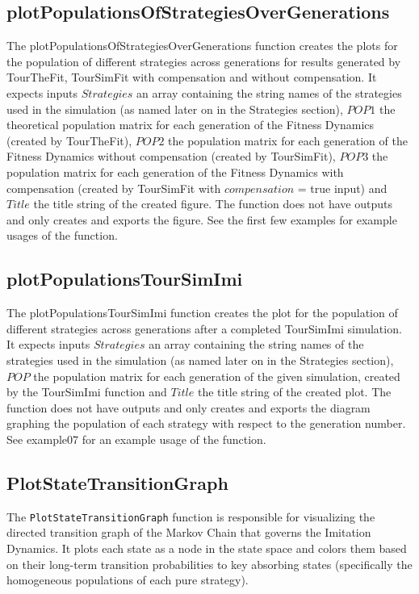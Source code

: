 \subsection{plotPopulationsOfStrategiesOverGenerations}
The plotPopulationsOfStrategiesOverGenerations function creates the plots for the population of different strategies across generations for results generated by TourTheFit, TourSimFit with compensation and without compensation. It expects inputs $Strategies$ an array containing the string names of the strategies used in the simulation (as named later on in the Strategies section), $POP1$ the theoretical population matrix for each generation of the Fitness Dynamics (created by TourTheFit), $POP2$ the population matrix for each generation of the Fitness Dynamics without compensation (created by TourSimFit), $POP3$ the population matrix for each generation of the Fitness Dynamics with compensation (created by TourSimFit with $compensation$ = true input) and $Title$ the title string of the created figure. The function does not have outputs and only creates and exports the figure. See the first few examples for example usages of the function.

\subsection{plotPopulationsTourSimImi}
The plotPopulationsTourSimImi function creates the plot for the population of different strategies across generations after a completed TourSimImi simulation. It expects inputs $Strategies$ an array containing the string names of the strategies used in the simulation (as named later on in the Strategies section), $POP$ the population matrix for each generation of the given simulation, created by the TourSimImi function and $Title$ the title string of the created plot. The function does not have outputs and only creates and exports the diagram graphing the population of each strategy with respect to the generation number. See example07 for an example usage of the function.

\subsection{PlotStateTransitionGraph}
The \texttt{PlotStateTransitionGraph} function is responsible for visualizing the directed transition graph of the Markov Chain that governs the Imitation Dynamics. It plots each state as a node in the state space and colors them based on their long-term transition probabilities to key absorbing states (specifically the homogeneous populations of each pure strategy).

